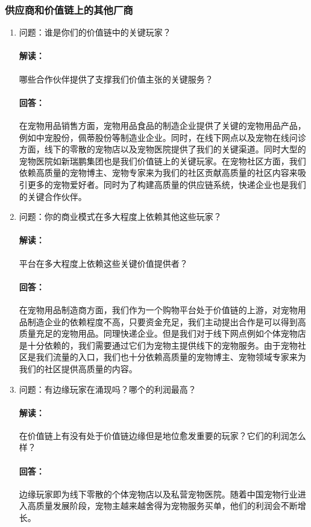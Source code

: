 \documentclass[a4paper]{ctexart}
\begin{document}
\subsubsection{供应商和价值链上的其他厂商}
\begin{enumerate}[label=\alph*.]
  \item 问题：谁是你们的价值链中的关键玩家？
  \paragraph{解读：}哪些合作伙伴提供了支撑我们价值主张的关键服务？
  \paragraph{回答：}在宠物用品销售方面，宠物用品食品的制造企业提供了关键的宠物用品产品，例如中宠股份，佩蒂股份等制造业企业。同时，在线下网点以及宠物在线问诊方面，线下的零散的宠物店以及宠物医院提供了我们的关键渠道。同时大型的宠物医院如新瑞鹏集团也是我们价值链上的关键玩家。在宠物社区方面，我们依赖高质量的宠物博主、宠物专家来为我们的社区贡献高质量的社区内容来吸引更多的宠物爱好者。同时为了构建高质量的供应链系统，快递企业也是我们的关键合作伙伴。
  \item 问题：你的商业模式在多大程度上依赖其他这些玩家？
  \paragraph{解读：}平台在多大程度上依赖这些关键价值提供者？
  \paragraph{回答：}在宠物用品制造商方面，我们作为一个购物平台处于价值链的上游，对宠物用品制造企业的依赖程度不高，只要资金充足，我们主动提出合作是可以得到高质量充足的宠物用品。同理快递企业。但是我们对于线下网点例如个体宠物店是十分依赖的，我们需要通过它们为宠物主提供线下的宠物服务。由于宠物社区是我们流量的入口，我们也十分依赖高质量的宠物博主、宠物领域专家来为我们的社区提供高质量的内容。
  \item 问题：有边缘玩家在涌现吗？哪个的利润最高？
  \paragraph{解读：}在价值链上有没有处于价值链边缘但是地位愈发重要的玩家？它们的利润怎么样？
  \paragraph{回答：}边缘玩家即为线下零散的个体宠物店以及私营宠物医院。随着中国宠物行业进入高质量发展阶段，宠物主越来越舍得为宠物服务买单，他们的利润会不断增长。
 \end{enumerate}
\end{document}
